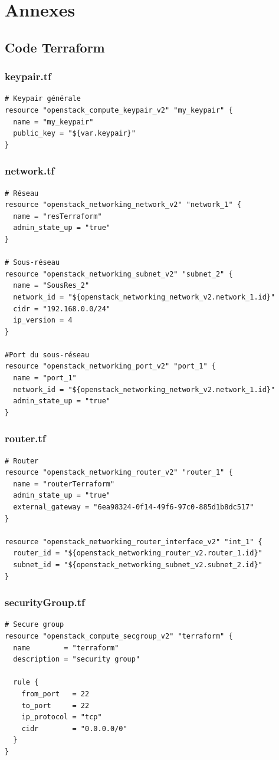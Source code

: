 \documentclass[]{article}
\begin{document}
\newpage
\section*{Annexes}
\subsection*{Code Terraform}
\subsubsection*{keypair.tf}
\begin{verbatim}
# Keypair générale
resource "openstack_compute_keypair_v2" "my_keypair" {
  name = "my_keypair"
  public_key = "${var.keypair}"
}
\end{verbatim}

\subsubsection*{network.tf}
\begin{verbatim}
# Réseau
resource "openstack_networking_network_v2" "network_1" {
  name = "resTerraform"
  admin_state_up = "true"
}

# Sous-réseau
resource "openstack_networking_subnet_v2" "subnet_2" {
  name = "SousRes_2"
  network_id = "${openstack_networking_network_v2.network_1.id}"
  cidr = "192.168.0.0/24"
  ip_version = 4 
}

#Port du sous-réseau
resource "openstack_networking_port_v2" "port_1" {
  name = "port_1"
  network_id = "${openstack_networking_network_v2.network_1.id}"
  admin_state_up = "true"
}
\end{verbatim}

\subsubsection*{router.tf}
\begin{verbatim}
# Router
resource "openstack_networking_router_v2" "router_1" {
  name = "routerTerraform"
  admin_state_up = "true"
  external_gateway = "6ea98324-0f14-49f6-97c0-885d1b8dc517"
}

resource "openstack_networking_router_interface_v2" "int_1" {
  router_id = "${openstack_networking_router_v2.router_1.id}"
  subnet_id = "${openstack_networking_subnet_v2.subnet_2.id}"
}
\end{verbatim}

\subsubsection*{securityGroup.tf}
\begin{verbatim}
# Secure group
resource "openstack_compute_secgroup_v2" "terraform" {
  name        = "terraform"
  description = "security group"
  
  rule {
    from_port   = 22
    to_port     = 22
    ip_protocol = "tcp"
    cidr        = "0.0.0.0/0"
  }
}
\end{verbatim}
\end{document}
